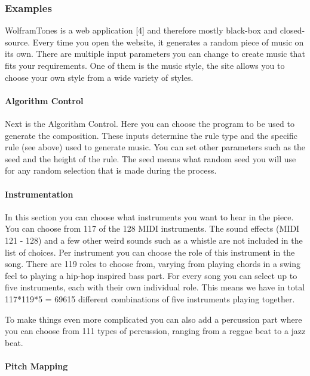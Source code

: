 \documentclass[12pt]{article}
\begin{document}
\subsubsection{Examples}

WolframTones is a web application [4] and therefore mostly black-box and closed-source. Every time you open the website, it generates a random piece of music on its own. There are multiple input parameters you can change to create music that fits your requirements. One of them is the music style, the site allows you to choose your own style from a wide variety of styles.

\paragraph{Algorithm Control}

Next is the Algorithm Control. Here you can choose the program to be used to generate the composition. These inputs determine the rule type and the specific rule (see above) used to generate music. You can set other parameters such as the seed and the height of the rule. The seed means what random seed you will use for any random selection that is made during the process.

\paragraph{Instrumentation}

In this section you can choose what instruments you want to hear in the piece. You can choose from 117 of the 128 MIDI instruments. The sound effects (MIDI 121 - 128) and a few other weird sounds such as a whistle are not included in the list of choices. Per instrument you can choose the role of this instrument in the song. There are 119 roles to choose from, varying from playing chords in a swing feel to playing a hip-hop inspired bass part. For every song you can select up to five instruments, each with their own individual role. This means we have in total 117*119*5 = 69615 different combinations of five instruments playing together.

To make things even more complicated you can also add a percussion part where you can choose from 111 types of percussion, ranging from a reggae beat to a jazz beat.

\paragraph{Pitch Mapping}
\end{document}
